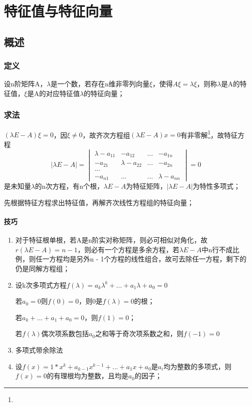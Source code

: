 
\chapter{特征值与特征向量}

\section{概述}

\subsection{定义}
设n阶矩阵A，\(\lambda\)是一个数，若存在n维非零列向量\(\xi\)，使得\(A\xi = \lambda\xi\)，则称\(\lambda\)是A的特征值，\(\xi\)是A的对应特征值\(\lambda\)的特征向量；

\subsection{求法}
\((\lambda E - A)\xi = 0\)，因\(\xi \neq 0\)，故齐次方程组\((\lambda E - A)x = 0\)有非零解\footnote[1]{\mymatrix}，故特征方程\[|\lambda E - A| = \begin{vmatrix}
\lambda - a_{11} & -a_{12} & ... & -a_{1n} \\ 
-a_{21} & \lambda - a_{22} & ... & -a_{2n} \\
... \\ 
-a_{n1} & ... & ... & \lambda - a_{nn}
\end{vmatrix} = 0\]是未知量\(\lambda\)的n次方程，有n个根，\(\lambda E - A\)为特征矩阵，\(|\lambda E - A|\)为特性多项式；

先根据特征方程求出特征值，再解齐次线性方程组的特征向量；

\subsubsection{技巧}
\begin{enumerate}
    \item 对于特征根单根，若A是n阶实对称矩阵，则必可相似对角化，故\(r(\lambda E - A) = n - 1\)，则必有一个方程是多余方程，若\(\lambda E - A\)中n行不成比例，则任一方程均是另外n - 1个方程的线性组合，故可去除任一方程，剩下的仍是同解方程组；
    \item 设k次多项式方程\(f(\lambda) = a_k\lambda^k + ... + a_1\lambda + a_0 = 0\)

    若\(a_0 = 0\)则\(f(0) = 0\)，则0是\(f(\lambda) = 0\)的根；

    若\(a_k + ... + a_1 + a_0 = 0\)，则\(f(1) = 0\)；

    若\(f(\lambda)\)偶次项系数包括\(a_0\)之和等于奇次项系数之和，则\(f(-1) = 0\)
    \item 多项式带余除法
    \item 设\(f(x) = 1 * x^k + a_{k - 1}x^{k - 1} + ... + a_1x + a_0\)是\(a_i\)均为整数的多项式，则\(f(x) = 0\)的有理根均为整数，且均是\(a_0\)的因子；
\end{enumerate}



